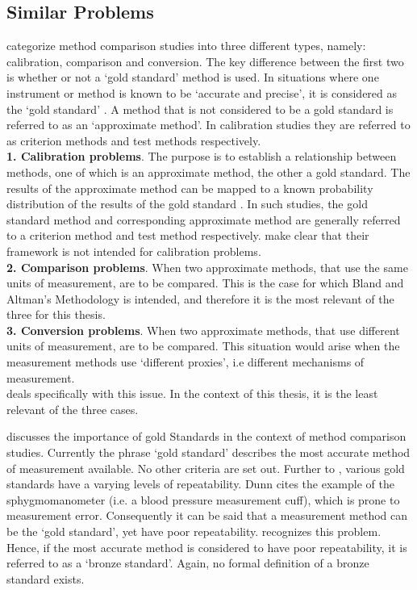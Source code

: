 \documentclass[12pt, a4paper]{report}
\theoremstyle{plain}
\theoremstyle{definition}
\theoremstyle{remark}
\begin{document}
\subsection{Similar Problems}
\citet{lewis1991} categorize method comparison studies into three
different types, namely: calibration, comparison and conversion. The key difference between the first two is
whether or not a `gold standard' method is used. In situations
where one instrument or method is known to be `accurate and
precise', it is considered as the `gold standard' \citep{lewis1991}. A
method that is not considered to be a gold standard is referred to
as an `approximate method'. In calibration studies they are
referred to as criterion methods and test methods respectively.\\
\smallskip
\textbf{1. Calibration problems}. The purpose is to establish a
relationship between methods, one of which is an approximate
method, the other a gold standard. The results of the approximate
method can be mapped to a known probability distribution of the
results of the gold standard \citep{lewis1991}. In such studies, the
gold standard method and corresponding approximate method are
generally referred to a criterion method and test method respectively. \citet*{BA83} make clear that their framework is
not intended for calibration problems.\\
\smallskip \textbf{2. Comparison problems}. When two approximate methods, that use the same units of measurement, are to be
compared. This is the case for which Bland and Altman's Methodology is intended, and therefore it is the most relevant of
the three for this thesis.\\
\smallskip \textbf{3. Conversion problems}. When two approximate methods, that use different units of measurement, are to be	compared. This situation would arise when the measurement methods
use `different proxies', i.e different mechanisms of measurement.\\
\smallskip
\citet{lewis1991} deals specifically with this issue. In the context
of this thesis, it is the least relevant of the three cases.

\citet{Aroy2015} discusses the importance of gold Standards in the context of method comparison studies.
Currently the phrase `gold standard' describes the most accurate method of measurement available. No other criteria are set out. Further to \citet{DunnSEME}, various gold standards have a varying levels of repeatability. Dunn cites the example of the sphygmomanometer (i.e. a blood pressure measurement cuff), which is prone to measurement error. Consequently it can be said that a measurement method can be the `gold standard', yet have poor repeatability. \citet{DunnSEME} recognizes this problem. Hence, if the most accurate method is considered to have poor repeatability, it is referred to as a `bronze standard'.  Again, no formal definition of a bronze standard exists.
\end{document}
